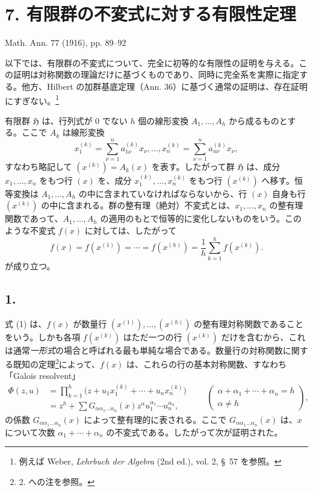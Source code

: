 \documentclass[11pt]{article}
\providecommand{\Hgrp}{\mathfrak{H}}
\begin{document}
\section*{7. 有限群の不変式に対する有限性定理}
\begin{center}
Math. Ann. 77 (1916), pp. 89--92
\end{center}

以下では、有限群の不変式について、完全に初等的な有限性の証明を与える。この証明は対称関数の理論だけに基づくものであり、同時に完全系を実際に指定する。他方、Hilbert の加群基底定理（Ann. 36）に基づく通常の証明は、存在証明にすぎない。\footnote{例えば Weber, \emph{Lehrbuch der Algebra} (2nd ed.), vol. 2, \S\ 57 を参照。}

有限群 $\Hgrp$ は、行列式が 0 でない $h$ 個の線形変換 $A_1,\ldots,A_h$ から成るものとする。ここで $A_k$ は線形変換
\[
  x_1^{(k)}=\sum_{\nu=1}^{n}a_{1\nu}^{(k)}x_\nu,\ldots,
  x_n^{(k)}=\sum_{\nu=1}^{n}a_{n\nu}^{(k)}x_\nu,
\]
すなわち略記して $(x^{(k)})=A_k(x)$ を表す。したがって群 $\Hgrp$ は、成分 $x_1,
\ldots,x_n$ をもつ行 $(x)$ を、成分 $x_1^{(k)},
\ldots,x_n^{(k)}$ をもつ行 $(x^{(k)})$ へ移す。恒等変換は $A_1,
\ldots,A_h$ の中に含まれていなければならないから、行 $(x)$ 自身も行 $(x^{(k)})$ の中に含まれる。群の整有理（絶対）不変式とは、$x_1,
\ldots,x_n$ の整有理関数であって、$A_1,
\ldots,A_h$ の適用のもとで恒等的に変化しないものをいう。このような不変式 $f(x)$ に対しては、したがって
\begin{equation}
  f(x)=f(x^{(1)})=\cdots=f(x^{(h)})=
  \frac1h\sum_{k=1}^{h}f(x^{(k)}).
\tag{1}
\end{equation}
が成り立つ。

\subsection*{1.}
式 (1) は、$f(x)$ が数量行 $(x^{(1)}),
\ldots,(x^{(h)})$ の整有理対称関数であることをいう。しかも各項 $f(x^{(k)})$ はただ一つの行 $(x^{(k)})$ だけを含むから、これは通常\emph{一形式}の場合と呼ばれる最も単純な場合である。数量行の対称関数に関する既知の定理\footnote{2. への注を参照。}によって、$f(x)$ は、これらの行の基本対称関数、すなわち「Galois resolvent」
\[
\begin{aligned}
  \Phi(z,u)
  &=\prod_{k=1}^{h}\bigl(z+u_1x_1^{(k)}+\cdots+u_nx_n^{(k)}\bigr) \\
  &=z^h+
    \sum G_{\alpha\alpha_1\ldots\alpha_n}(x)
    z^{\alpha}u_1^{\alpha_1}\cdots u_n^{\alpha_n},
\end{aligned}
\qquad
\left(\begin{array}{c}
\alpha+\alpha_1+
\cdots+
\alpha_n=h\\
\alpha\ne h
\end{array}\right),
\]
の係数 $G_{\alpha\alpha_1\ldots\alpha_n}(x)$ によって整有理的に表される。ここで $G_{\alpha\alpha_1\ldots\alpha_n}(x)$ は、$x$ について次数 $\alpha_1+\cdots+\alpha_n$ の不変式である。したがって次が証明された。
\end{document}
